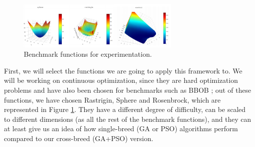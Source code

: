 \documentclass[runningheads]{llncs}
\begin{document}
%
\begin{figure}[htp]
  \centering
    \includegraphics[width=0.7\textwidth]{img/benchmark.png}
    \caption{Benchmark functions for experimentation.} \label{fig:functions}
    \end{figure}
%
First, we will select the functions we are going to apply this
framework to. We will be working on continuous optimization, since
they are hard optimization problems and have also been chosen for
benchmarks such as BBOB \cite{hansen2010bbob}; out of these functions,
we have chosen Rastrigin, Sphere and Rosenbrock, which are represented
in Figure \ref{fig:functions}. They have a different
degree of difficulty, can be scaled to different dimensions (as all
the rest of the benchmark functions), and they can at least give us an
idea of how single-breed (GA or PSO) algorithms perform compared to
our cross-breed (GA+PSO) version.
%
\end{document}
